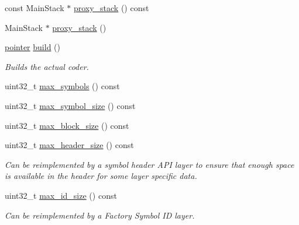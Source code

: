 \begin{DoxyCompactItemize}
\item 
const Main\-Stack $\ast$ \hyperlink{classkodo_1_1proxy__layer_1_1factory_a55217089ea58145634d9bdd8211e1a25}{proxy\-\_\-stack} () const 
\item 
Main\-Stack $\ast$ \hyperlink{classkodo_1_1proxy__layer_1_1factory_ac67a8d00040902bc879a717224b48d7a}{proxy\-\_\-stack} ()
\item 
\hyperlink{classkodo_1_1proxy__layer_a71fd0add2f17f6506c5457348922e966}{pointer} \hyperlink{classkodo_1_1proxy__layer_1_1factory_af37811238cc040267607f6fc2a55cac0}{build} ()
\begin{DoxyCompactList}\small\item\em Builds the actual coder. \end{DoxyCompactList}\item 
uint32\-\_\-t \hyperlink{classkodo_1_1proxy__layer_1_1factory_ad4bdf285390019f38ee1aed95b90dce0}{max\-\_\-symbols} () const 
\begin{DoxyCompactList}\small\item\em \end{DoxyCompactList}\item 
uint32\-\_\-t \hyperlink{classkodo_1_1proxy__layer_1_1factory_a7d3e800a3de78517fe6e33879a16ede9}{max\-\_\-symbol\-\_\-size} () const 
\begin{DoxyCompactList}\small\item\em \end{DoxyCompactList}\item 
uint32\-\_\-t \hyperlink{classkodo_1_1proxy__layer_1_1factory_a652f34c8a36835b7ced0791c59c9a04c}{max\-\_\-block\-\_\-size} () const 
\begin{DoxyCompactList}\small\item\em \end{DoxyCompactList}\item 
uint32\-\_\-t \hyperlink{classkodo_1_1proxy__layer_1_1factory_ac6d5eaac02b609fe2610f434975d31a7}{max\-\_\-header\-\_\-size} () const 
\begin{DoxyCompactList}\small\item\em Can be reimplemented by a symbol header A\-P\-I layer to ensure that enough space is available in the header for some layer specific data. \end{DoxyCompactList}\item 
uint32\-\_\-t \hyperlink{classkodo_1_1proxy__layer_1_1factory_aaea722dd0db84b39f667049b616d9782}{max\-\_\-id\-\_\-size} () const 
\begin{DoxyCompactList}\small\item\em Can be reimplemented by a Factory Symbol I\-D layer. \end{DoxyCompactList}\item 

\end{DoxyCompactItemize}

